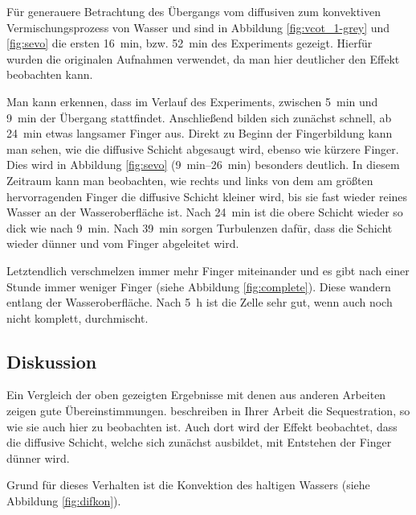 Für generauere Betrachtung des Übergangs vom diffusiven zum konvektiven Vermischungsprozess von Wasser und \COT sind in Abbildung \ref{fig:vcot_1-grey} und \ref{fig:sevo} die ersten \SI{16}{\minute}, bzw. \SI{52}{\minute} des Experiments gezeigt. Hierfür wurden die originalen Aufnahmen verwendet, da man hier deutlicher den Effekt beobachten kann.

Man kann erkennen, dass im Verlauf des Experiments, zwischen \SI{5}{\minute} und \SI{9}{\minute} der Übergang stattfindet. Anschließend bilden sich zunächst schnell, ab \SI{24}{\minute} etwas langsamer Finger aus. Direkt zu Beginn der Fingerbildung kann man sehen, wie die diffusive Schicht abgesaugt wird, ebenso wie kürzere Finger. Dies wird in Abbildung \ref{fig:sevo} (\SIrange{9}{26}{\minute}) besonders deutlich. In diesem Zeitraum kann man beobachten, wie rechts und links von dem am größten hervorragenden Finger die diffusive Schicht kleiner wird, bis sie fast wieder reines Wasser an der Wasseroberfläche ist. Nach \SI{24}{\minute} ist die obere \COT Schicht wieder so dick wie nach \SI{9}{\minute}. Nach \SI{39}{\minute} sorgen Turbulenzen dafür, dass die Schicht wieder dünner und vom Finger abgeleitet wird.

Letztendlich verschmelzen immer mehr Finger miteinander und es gibt nach einer Stunde immer weniger Finger (siehe \zB Abbildung \ref{fig:complete}). Diese wandern entlang der Wasseroberfläche.
Nach \SI{5}{\hour} ist die Zelle sehr gut, wenn auch noch nicht komplett, durchmischt.


\subsection{Diskussion}
\label{res:cot:disk}

Ein Vergleich der oben gezeigten Ergebnisse mit denen aus anderen Arbeiten zeigen gute Übereinstimmungen.
\cite{kneafsy} beschreiben in Ihrer Arbeit die \COTm Sequestration, so wie sie auch hier zu beobachten ist. Auch dort wird der Effekt beobachtet, dass die diffusive Schicht, welche sich zunächst ausbildet, mit Entstehen der Finger dünner wird.

Grund für dieses Verhalten ist die Konvektion des \COTm haltigen Wassers (siehe Abbildung \ref{fig:difkon}). 

